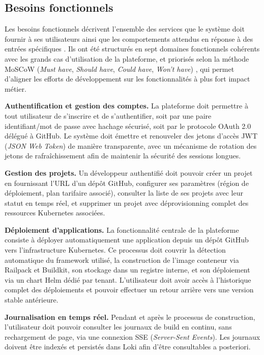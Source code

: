 \subsection{Besoins fonctionnels}

Les besoins fonctionnels décrivent l'ensemble des services que le système doit fournir à ses utilisateurs ainsi que les comportements attendus en réponse à des entrées spécifiques \cite{sommerville-se}. Ils ont été structurés en sept domaines fonctionnels cohérents avec les grands cas d'utilisation de la plateforme, et priorisés selon la méthode MoSCoW (\textit{Must have}, \textit{Should have}, \textit{Could have}, \textit{Won't have}) \cite{moscow-ieee}, qui permet d'aligner les efforts de développement sur les fonctionnalités à plus fort impact métier.

\textbf{Authentification et gestion des comptes.} La plateforme doit permettre à tout utilisateur de s'inscrire et de s'authentifier, soit par une paire identifiant/mot de passe avec hachage sécurisé, soit par le protocole OAuth 2.0 délégué à GitHub. Le système doit émettre et renouveler des jetons d'accès JWT (\textit{JSON Web Token}) de manière transparente, avec un mécanisme de rotation des jetons de rafraîchissement afin de maintenir la sécurité des sessions longues.

\textbf{Gestion des projets.} Un développeur authentifié doit pouvoir créer un projet en fournissant l'URL d'un dépôt GitHub, configurer ses paramètres (région de déploiement, plan tarifaire associé), consulter la liste de ses projets avec leur statut en temps réel, et supprimer un projet avec déprovisionning complet des ressources Kubernetes associées.

\textbf{Déploiement d'applications.} La fonctionnalité centrale de la plateforme consiste à déployer automatiquement une application depuis un dépôt GitHub vers l'infrastructure Kubernetes. Ce processus doit couvrir la détection automatique du framework utilisé, la construction de l'image conteneur via Railpack et Buildkit, son stockage dans un registre interne, et son déploiement via un chart Helm dédié par tenant. L'utilisateur doit avoir accès à l'historique complet des déploiements et pouvoir effectuer un retour arrière vers une version stable antérieure.

\textbf{Journalisation en temps réel.} Pendant et après le processus de construction, l'utilisateur doit pouvoir consulter les journaux de build en continu, sans rechargement de page, via une connexion SSE (\textit{Server-Sent Events}). Les journaux doivent être indexés et persistés dans Loki afin d'être consultables a posteriori.


